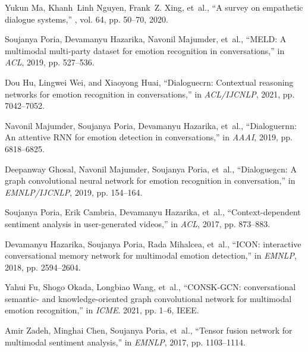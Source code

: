 \begin{thebibliography}{10}

  Yukun Ma, Khanh~Linh Nguyen, Frank~Z. Xing, et~al.,
  \newblock ``A survey on empathetic dialogue systems,''
  , vol. 64, pp. 50--70, 2020.
  
  Soujanya Poria, Devamanyu Hazarika, Navonil Majumder, et~al.,
  \newblock ``{MELD:} {A} multimodal multi-party dataset for emotion recognition
    in conversations,''
  \newblock in {\em {ACL}}, 2019, pp. 527--536.
  
  Dou Hu, Lingwei Wei, and Xiaoyong Huai,
  \newblock ``Dialoguecrn: Contextual reasoning networks for emotion recognition
    in conversations,''
  \newblock in {\em {ACL/IJCNLP}}, 2021, pp. 7042--7052.
  
  Navonil Majumder, Soujanya Poria, Devamanyu Hazarika, et~al.,
  \newblock ``Dialoguernn: An attentive {RNN} for emotion detection in
    conversations,''
  \newblock in {\em {AAAI}}, 2019, pp. 6818--6825.
  
  Deepanway Ghosal, Navonil Majumder, Soujanya Poria, et~al.,
  \newblock ``Dialoguegcn: {A} graph convolutional neural network for emotion
    recognition in conversation,''
  \newblock in {\em {EMNLP/IJCNLP}}, 2019, pp. 154--164.
  
  Soujanya Poria, Erik Cambria, Devamanyu Hazarika, et~al.,
  \newblock ``Context-dependent sentiment analysis in user-generated videos,''
  \newblock in {\em {ACL}}, 2017, pp. 873--883.
  
  Devamanyu Hazarika, Soujanya Poria, Rada Mihalcea, et~al.,
  \newblock ``{ICON:} interactive conversational memory network for multimodal
    emotion detection,''
  \newblock in {\em {EMNLP}}, 2018, pp. 2594--2604.
  
  Yahui Fu, Shogo Okada, Longbiao Wang, et~al.,
  \newblock ``{CONSK-GCN:} conversational semantic- and knowledge-oriented graph
    convolutional network for multimodal emotion recognition,''
  \newblock in {\em {ICME}}. 2021, pp. 1--6, {IEEE}.
  
  Amir Zadeh, Minghai Chen, Soujanya Poria, et~al.,
  \newblock ``Tensor fusion network for multimodal sentiment analysis,''
  \newblock in {\em {EMNLP}}, 2017, pp. 1103--1114.
  

\end{thebibliography}
